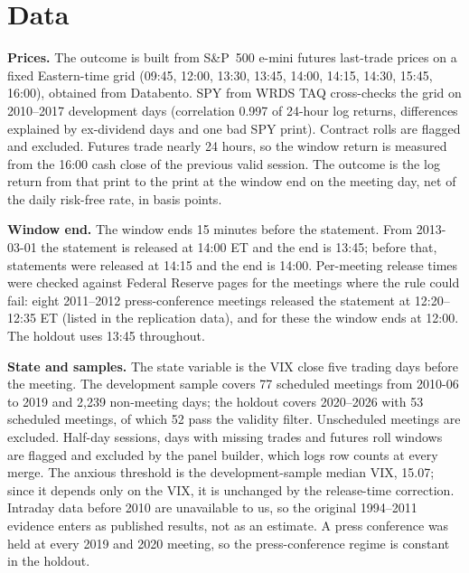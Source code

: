 \section{Data}\label{sec:data}
\textbf{Prices.} The outcome is built from S\&P~500 e-mini futures last-trade prices on a fixed Eastern-time grid (09:45, 12:00, 13:30, 13:45, 14:00, 14:15, 14:30, 15:45, 16:00), obtained from Databento. SPY from WRDS TAQ cross-checks the grid on 2010--2017 development days (correlation 0.997 of 24-hour log returns, differences explained by ex-dividend days and one bad SPY print). Contract rolls are flagged and excluded. Futures trade nearly 24 hours, so the window return is measured from the 16:00 cash close of the previous valid session. The outcome is the log return from that print to the print at the window end on the meeting day, net of the daily risk-free rate, in basis points.

\textbf{Window end.} The window ends 15 minutes before the statement. From 2013-03-01 the statement is released at 14:00 ET and the end is 13:45; before that, statements were released at 14:15 and the end is 14:00. Per-meeting release times were checked against Federal Reserve pages for the meetings where the rule could fail: eight 2011--2012 press-conference meetings released the statement at 12:20--12:35 ET (listed in the replication data), and for these the window ends at 12:00. The holdout uses 13:45 throughout.

\textbf{State and samples.} The state variable is the VIX close five trading days before the meeting. The development sample covers 77 scheduled meetings from 2010-06 to 2019 and 2{,}239 non-meeting days; the holdout covers 2020--2026 with 53 scheduled meetings, of which 52 pass the validity filter. Unscheduled meetings are excluded. Half-day sessions, days with missing trades and futures roll windows are flagged and excluded by the panel builder, which logs row counts at every merge. The anxious threshold is the development-sample median VIX, 15.07; since it depends only on the VIX, it is unchanged by the release-time correction. Intraday data before 2010 are unavailable to us, so the original 1994--2011 evidence enters as published results, not as an estimate. A press conference was held at every 2019 and 2020 meeting, so the press-conference regime is constant in the holdout.